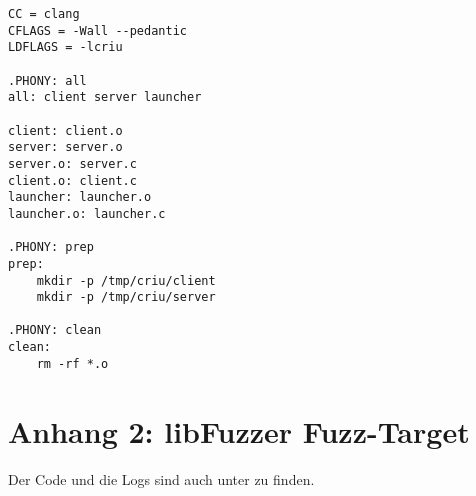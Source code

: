 \documentclass[a4paper]{article}
\begin{document}
\begin{lstlisting}[caption=Mit TCP: Makefile,language=Make]
CC = clang
CFLAGS = -Wall --pedantic
LDFLAGS = -lcriu

.PHONY: all
all: client server launcher

client: client.o
server: server.o
server.o: server.c
client.o: client.c
launcher: launcher.o
launcher.o: launcher.c

.PHONY: prep
prep:
	mkdir -p /tmp/criu/client
	mkdir -p /tmp/criu/server

.PHONY: clean
clean:
	rm -rf *.o

\end{lstlisting}

\clearpage
\section*{Anhang 2: libFuzzer Fuzz-Target}

Der Code und die Logs sind auch unter  zu finden.
\end{document}
